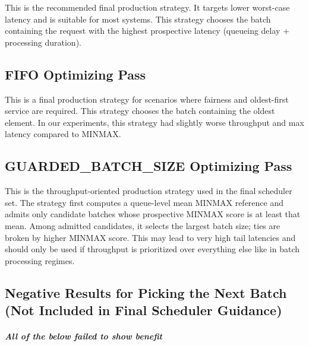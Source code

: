 \documentclass{article}
\begin{document}
This is the recommended final production strategy. It targets lower
worst-case latency and is suitable for most systems. This strategy
chooses the batch containing the request with the highest prospective
latency (queueing delay + processing duration).

\hypertarget{43-fifo-optimizing-pass}{%
\subsection{FIFO Optimizing Pass}\label{43-fifo-optimizing-pass}}

This is a final production strategy for scenarios where fairness and
oldest-first service are required. This strategy chooses the batch
containing the oldest element. In our experiments, this strategy had
slightly worse throughput and max latency compared to MINMAX.

\hypertarget{44-guarded_batch_size-optimizing-pass}{%
\subsection{GUARDED\_BATCH\_SIZE Optimizing
Pass}\label{44-guarded_batch_size-optimizing-pass}}

This is the throughput-oriented production strategy used in the final
scheduler set. The strategy first computes a queue-level mean MINMAX
reference and admits only candidate batches whose prospective MINMAX
score is at least that mean. Among admitted candidates, it selects the
largest batch size; ties are broken by higher MINMAX score. This may
lead to very high tail latencies and should only be used if throughput
is prioritized over everything else like in batch processing regimes.

\hypertarget{45-negative-results-for-picking-the-next-batch-not-included-in-final-scheduler-guidance}{%
\subsection{Negative Results for Picking the Next Batch (Not
Included in Final Scheduler
Guidance)}\label{45-negative-results-for-picking-the-next-batch-not-included-in-final-scheduler-guidance}}

\hypertarget{all-of-the-below-failed-to-show-benefit}{%
\subparagraph{All of the below failed to show
benefit}\label{all-of-the-below-failed-to-show-benefit}}
\end{document}
